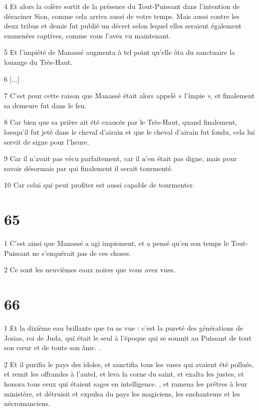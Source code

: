 \par 4 Et alors la colère sortit de la présence du Tout-Puissant dans l'intention de déraciner Sion, comme cela arriva aussi de votre temps. Mais aussi contre les deux tribus et demie fut publié un décret selon lequel elles seraient également emmenées captives, comme vous l'avez vu maintenant.

\par 5 Et l'impiété de Manassé augmenta à tel point qu'elle ôta du sanctuaire la louange du Très-Haut.

\par 6 [...]

\par 7 C'est pour cette raison que Manassé était alors appelé « l'impie », et finalement sa demeure fut dans le feu.

\par 8 Car bien que sa prière ait été exaucée par le Très-Haut, quand finalement, lorsqu'il fut jeté dans le cheval d'airain et que le cheval d'airain fut fondu, cela lui servit de signe pour l'heure.

\par 9 Car il n'avait pas vécu parfaitement, car il n'en était pas digne, mais pour savoir désormais par qui finalement il serait tourmenté.

\par 10 Car celui qui peut profiter est aussi capable de tourmenter.

\chapter{65}

\par 1 C'est ainsi que Manassé a agi impiement, et a pensé qu'en son temps le Tout-Puissant ne s'enquérait pas de ces choses.

\par 2 Ce sont les neuvièmes eaux noires que vous avez vues.

\chapter{66}

\par 1 Et la dixième eau brillante que tu as vue : c'est la pureté des générations de Josias, roi de Juda, qui était le seul à l'époque qui se soumit au Puissant de tout son cœur et de toute son âme. .

\par 2 Et il purifia le pays des idoles, et sanctifia tous les vases qui avaient été pollués, et remit les offrandes à l'autel, et leva la corne du saint, et exalta les justes, et honora tous ceux qui étaient sages en intelligence. , et ramena les prêtres à leur ministère, et détruisit et expulsa du pays les magiciens, les enchanteurs et les nécromanciens.

